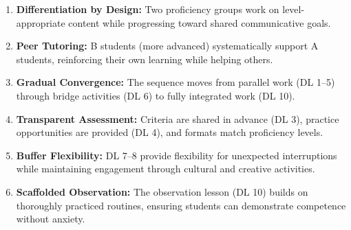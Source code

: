 \documentclass[11pt, a4paper]{article}
\begin{document}
\begin{enumerate}[leftmargin=2em]
    \item \textbf{Differentiation by Design:} Two proficiency groups work on level-appropriate content while progressing toward shared communicative goals.

    \item \textbf{Peer Tutoring:} B students (more advanced) systematically support A students, reinforcing their own learning while helping others.

    \item \textbf{Gradual Convergence:} The sequence moves from parallel work (DL 1--5) through bridge activities (DL 6) to fully integrated work (DL 10).

    \item \textbf{Transparent Assessment:} Criteria are shared in advance (DL 3), practice opportunities are provided (DL 4), and formats match proficiency levels.

    \item \textbf{Buffer Flexibility:} DL 7--8 provide flexibility for unexpected interruptions while maintaining engagement through cultural and creative activities.

    \item \textbf{Scaffolded Observation:} The observation lesson (DL 10) builds on thoroughly practiced routines, ensuring students can demonstrate competence without anxiety.
\end{enumerate}
\end{document}
